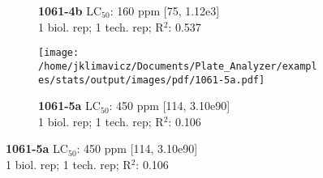 \documentclass{article}
\begin{document}
\begin{figure}[thp!]
\begin{subfigure}{0.500\textwidth}
      \vspace{-0.05cm}
      \caption*{\textbf{1061-4b} LC$_{50}$: 160 ppm [75, 1.12e3] \\ 
1 biol. rep; 1 tech. rep; R$^2$: 0.537}
      \vspace{0.1cm}
   \end{subfigure}%
   \begin{subfigure}{0.500\textwidth}
      \centering
      \texttt{[image: /home/jklimavicz/Documents/Plate\_Analyzer/examples/stats/output/images/pdf/1061-5a.pdf]}
      \vspace{-0.05cm}
      \caption*{\textbf{1061-5a} LC$_{50}$: 450 ppm [114, 3.10e90] \\ 
1 biol. rep; 1 tech. rep; R$^2$: 0.106}
      \vspace{0.1cm}
   \end{subfigure}%
\end{figure}
\clearpage
\pagebreak
\vspace{-0.1cm}
\end{document}
